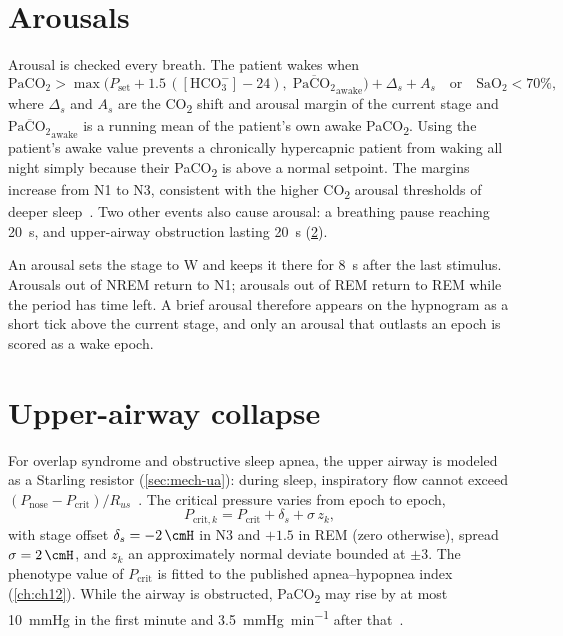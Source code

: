 \section{Arousals}
\label{sec:sl-arousal}
Arousal is checked every breath. The patient wakes when
\begin{equation}
\mathrm{PaCO_2} > \max\bigl(P_{\mathrm{set}} + 1.5\,([\mathrm{HCO_3^-}] - 24),\;\overline{\mathrm{PaCO_2}}_{\mathrm{awake}}\bigr) + \Delta_s + A_s
\quad\text{or}\quad \mathrm{SaO_2} < 70\%,
\label{eq:sl-arousal}
\end{equation}
where $\Delta_s$ and $A_s$ are the CO\textsubscript{2} shift and arousal margin of the current stage and $\overline{\mathrm{PaCO_2}}_{\mathrm{awake}}$ is a running mean of the patient's own awake PaCO\textsubscript{2}. Using the patient's awake value prevents a chronically hypercapnic patient from waking all night simply because their PaCO\textsubscript{2} is above a normal setpoint. The margins increase from N1 to N3, consistent with the higher CO\textsubscript{2} arousal thresholds of deeper sleep~\citep{berthonjones1984}. Two other events also cause arousal: a breathing pause reaching \SI{20}{\second}, and upper-airway obstruction lasting \SI{20}{\second} (\cref{sec:sl-ua}).

An arousal sets the stage to W and keeps it there for \SI{8}{\second} after the last stimulus. Arousals out of NREM return to N1; arousals out of REM return to REM while the period has time left. A brief arousal therefore appears on the hypnogram as a short tick above the current stage, and only an arousal that outlasts an epoch is scored as a wake epoch.

\section{Upper-airway collapse}
\label{sec:sl-ua}
For overlap syndrome and obstructive sleep apnea, the upper airway is modeled as a Starling resistor (\cref{sec:mech-ua}): during sleep, inspiratory flow cannot exceed $(P_{\mathrm{nose}} - P_{\mathrm{crit}})/R_{us}$~\citep{gleadhill1991}. The critical pressure varies from epoch to epoch,
\begin{equation}
P_{\mathrm{crit},k} = P_{\mathrm{crit}} + \delta_s + \sigma\,z_k,
\label{eq:sl-pcrit}
\end{equation}
with stage offset $\delta_s = \SI{-2}{\cmH}$ in N3 and $+1.5$ in REM (zero otherwise), spread $\sigma = \SI{2}{\cmH}$, and $z_k$ an approximately normal deviate bounded at $\pm3$. The phenotype value of $P_{\mathrm{crit}}$ is fitted to the published apnea--hypopnea index (\cref{ch:ch12}). While the airway is obstructed, PaCO\textsubscript{2} may rise by at most \SI{10}{\mmHg} in the first minute and \SI{3.5}{\mmHg\per\minute} after that~\citep{stock1988}.


